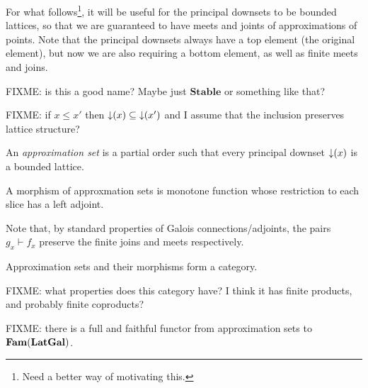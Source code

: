 For what follows\footnote{Need a better way of motivating this.}, it
will be useful for the principal downsets to be bounded lattices, so
that we are guaranteed to have meets and joints of approximations of
points. Note that the principal downsets always have a top element
(the original element), but now we are also requiring a bottom
element, as well as finite meets and joins.

FIXME: is this a good name? Maybe just $\mathbf{Stable}$ or something
like that?

FIXME: if $x \leq x'$ then $\mathop{\downarrow}(x) \subseteq \mathop{\downarrow}(x')$ and I
assume that the inclusion preserves lattice structure?

\begin{definition}
  An \emph{approximation set} is a partial order such that every
  principal downset $\mathop{\downarrow}(x)$ is a bounded lattice.

  A morphism of approxmation sets is monotone function whose
  restriction to each slice has a left adjoint.
\end{definition}

Note that, by standard properties of Galois connections/adjoints, the
pairs $g_x \vdash f_x$ preserve the finite joins and meets respectively.

\begin{proposition}
  Approximation sets and their morphisms form a category.
\end{proposition}

FIXME: what properties does this category have? I think it has finite
products, and probably finite coproducts?

FIXME: there is a full and faithful functor from approximation sets to
$\mathbf{Fam}(\mathbf{LatGal})$.
